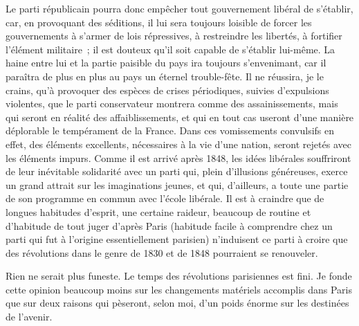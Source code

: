 \documentclass[french,twoside]{book} %
\begin{document}
Le parti républicain pourra donc empêcher tout gouvernement libéral de s’établir, car, en provoquant des séditions, il lui sera toujours loisible de forcer les gouvernements à s’armer de lois répressives, à restreindre les libertés, à fortifier l’élément militaire ; il est douteux qu’il soit capable de s’établir lui-même. La haine entre lui et la partie paisible du pays ira toujours s’envenimant, car il paraîtra de plus en plus au pays un éternel trouble-fête. Il ne réussira, je le crains, qu’à provoquer des espèces de crises périodiques, suivies d’expulsions violentes, que le parti conservateur montrera comme des assainissements, mais qui seront en réalité des affaiblissements, et qui en tout cas useront d’une manière déplorable le tempérament de la France. Dans ces vomissements convulsifs en effet, des éléments excellents, nécessaires à la vie d’une nation, seront rejetés avec les éléments impurs. Comme il est arrivé après 1848, les idées libérales souffriront de leur inévitable solidarité avec un parti qui, plein d’illusions généreuses, exerce un grand attrait sur les imaginations jeunes, et qui, d’ailleurs, a toute une partie de son programme en commun avec l’école libérale. Il est à craindre que de longues habitudes d’esprit, une certaine raideur, beaucoup de routine et d’habitude de tout juger d’après Paris (habitude facile à comprendre chez un parti qui fut à l’origine essentiellement parisien) n’induisent ce parti à croire que des révolutions dans le genre de 1830 et de 1848 pourraient se renouveler.\par
Rien ne serait plus funeste. Le temps des révolutions parisiennes est fini. Je fonde cette opinion beaucoup moins sur les changements matériels accomplis dans Paris que sur deux raisons qui pèseront, selon moi, d’un poids énorme sur les destinées de l’avenir.\par
\end{document}
